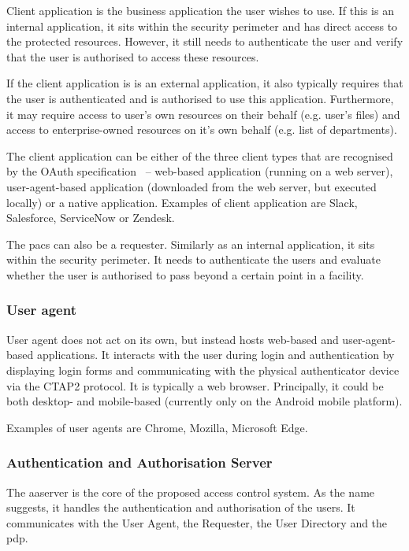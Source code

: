 Client application is the business application the user wishes to use. If this is an internal application, it sits within the security perimeter and has direct access to the protected resources. However, it still needs to authenticate the user and verify that the user is authorised to access these resources.

If the client application is is an external application, it also typically requires that the user is authenticated and is authorised to use this application. Furthermore, it may require access to user's own resources on their behalf (e.g. user's files) and access to enterprise-owned resources on it's own behalf (e.g. list of departments).
    
The client application can be either of the three client types that are recognised by the OAuth specification~\cite{Hardt2012TheFramework} -- web-based application (running on a web server), user-agent-based application (downloaded from the web server, but executed locally) or a native application. Examples of client application are Slack, Salesforce, ServiceNow or Zendesk.

The \acrshort{pacs} can also be a requester. Similarly as an internal application, it sits within the security perimeter. It needs to authenticate the users and evaluate whether the user is authorised to pass beyond a certain point in a facility.

\subsubsection{User agent}
User agent does not act on its own, but instead hosts web-based and user-agent-based applications. It interacts with the user during login and authentication by displaying login forms and communicating with the physical authenticator device via the CTAP2 protocol\footnotemark. It is typically a web browser. Principally, it could be both desktop- and mobile-based (currently only on the Android mobile platform). 
% 

Examples of user agents are Chrome, Mozilla, Microsoft Edge.

\subsubsection{Authentication and Authorisation Server} 
The \acrfull{aaserver} is the core of the proposed access control system. As the name suggests, it handles the authentication and authorisation of the users. It communicates with the User Agent, the Requester, the User Directory and the \acrshort{pdp}.
    
